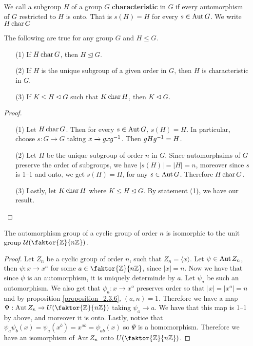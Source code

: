 \begin{definition}
  We call a subgroup $H$ of a group  $G$  \textbf{characteristic} in $G$ if
  every automorphism of $G$ restricted to  $H$ is onto. That is $s(H)=H$ for
  every $s \in \operatorname{Aut}{G}$. We write $H \operatorname{char}{G}$
\end{definition}

\begin{proposition}\label{proposition_4.4.4}
  The following are true for any group $G$ and  $H \leq G$.
  \begin{enumerate}
    \item[(1)] If $H \operatorname{char}{G}$, then $H \unlhd{G}$.

    \item[(2)] If $H$ is the unique subgroup of a given order in  $G$, then
      $H$ is characteristic in  $G$.

    \item[(3)] If $K \leq H \unlhd G$ such that  $K \operatorname{char}{H}$, then $K
      \unlhd G$.
  \end{enumerate}
\end{proposition}
\begin{proof}
  \begin{enumerate}
    \item[(1)] Let $H \operatorname{char}{G}$. Then for every $s \in \operatorname{Aut}{G}$, $s(H)=H$.
      In particular, choose $s:G \xrightarrow{} G$ taking $x
      \xrightarrow{} gxg^{-1}$. Then $gHg^{-1}=H$.

    \item[(2)] Let $H$ be the unique subgroup of order $n$ in $G$. Since
      automorphsims of $G$ preserve the order of subgroups, we have
      $|s(H)|=|H|=n$, moreover since $s$ is 1--1 and onto, we get
      $s(H)=H$, for any $s \in \operatorname{Aut}{G}$. Therefore $H \operatorname{char}{G}$.

    \item[(3)] Lastly, let $K \operatorname{char}{H}$ where $K \leq H \unlhd G$. By
      statement (1), we have our result.
  \end{enumerate}
\end{proof}

\begin{theorem}\label{proposition_4.4.5}
  The automorphism group of a cyclic group of order $n$ is isomorphic to the
  unit group $\Uc{(\faktor{\Z}{n\Z})}$.
\end{theorem}
\begin{proof}
  Let $Z_n$ be a cyclic group of order $n$, such that $Z_n=\langle x \rangle$.
  Let $\psi \in \operatorname{Aut}{Z_n}$, then $\psi:x \xrightarrow{} x^a$ for some $a \in
  \faktor{\Z}{n\Z}$, since $|x|=n$. Now we have that since $\psi$ is an
  automorphism, it is uniquely determinde by $a$. Let $\psi_a$ be such an
  automorphism. We also get that  $\psi_a:x \xrightarrow{} x^a$ preserves
  order so that $|x|=|x^a|=n$ and by proposition \ref{proposition_2.3.6}, $(a,n)=1$.
  Therefore we have a map $\Psi:\Aut{Z_n} \xrightarrow{} U(\faktor{\Z}{n\Z})$
  taking $\psi_a \xrightarrow{} a$. We have that this map is 1--1 by above,
  and moreover it is onto. Lastly, notice that
  $\psi_a\psi_b(x)=\psi_a(x^b)=x^{ab}=\psi_{ab}(x)$ so $\Psi$ is a
  homomorphism. Therefore we have an isomorphism of $\operatorname{Aut}{Z_n}$ onto
  $U(\faktor{\Z}{n\Z})$.
\end{proof}

